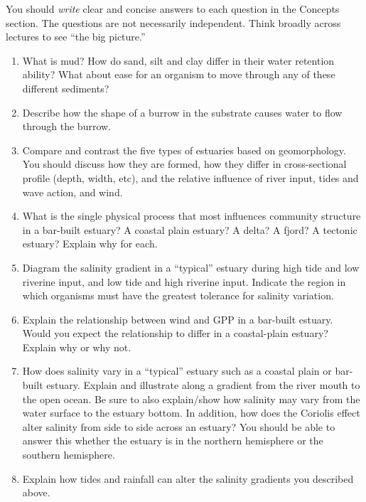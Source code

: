 \documentclass[nofonts, letterpaper]{tufte-handout}
\begin{document}
You should \emph{write} clear and concise answers to each question in the Concepts section.  The questions are not necessarily independent.  Think broadly across lectures to see ``the big picture.'' 

\begin{enumerate}

	\item What is mud?  How do sand, silt and clay differ in their water retention ability?  What about ease for an organism to move through any of these different sediments?

	\item Describe how the shape of a burrow in the substrate causes water to flow through the burrow.
	
	\item Compare and contrast the five types of estuaries based on geomorphology.  You should discuss how they are formed, how they differ in cross-sectional profile (depth, width, etc), and the relative influence of river input, tides and wave action, and wind.

\item
  What is the single physical process that most influences community
  structure in a bar-built estuary? A coastal plain estuary? A delta? A fjord? A
  tectonic estuary? Explain why for each.

\item
  Diagram the salinity gradient in a ``typical'' estuary during high
  tide and low riverine input, and low tide and high riverine input.
  Indicate the region in which organisms must have the greatest
  tolerance for salinity variation.

\item
  Explain the relationship between wind and GPP in a bar-built estuary.
  Would you expect the relationship to differ in a coastal-plain
  estuary? Explain why or why not.

	\item How does salinity vary in a ``typical'' estuary such as a coastal plain or bar-built estuary.  Explain and illustrate along a gradient from the river mouth to the open ocean.  Be sure to also explain/show how salinity may vary from the water surface to the estuary bottom.  In addition, how does the Coriolis effect alter salinity from side to side across an estuary?  You should be able to answer this whether the estuary is in the northern hemisphere or the southern hemisphere.  

	\item Explain how tides and rainfall can alter the salinity gradients you described above.


\end{enumerate}
\end{document}
